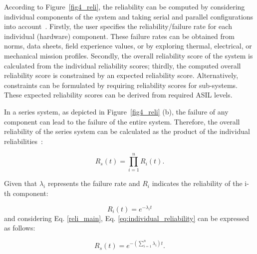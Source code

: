     
    According to Figure~\ref{fig4_reli}, the reliability can be computed by considering individual components of the system and taking serial and parallel configurations into account~\cite{Menčík16}. 
    Firstly, the user specifies the reliability/failure rate for each individual (hardware) component. These failure rates can be obtained from norms, data sheets, field experience values, or by exploring thermal, electrical, or mechanical mission profiles.
    Secondly, the overall reliability score of the system is calculated from the individual reliability scores; thirdly, the computed overall reliability score is constrained by an expected reliability score. Alternatively, constraints can be formulated by requiring reliability scores for sub-systems. These expected reliability scores can be derived from required ASIL levels.

     In a series system, as depicted in Figure~\ref{fig4_reli} (b), the failure of any component can lead to the failure of the entire system. Therefore, the overall reliability of the series system can be calculated as the product of the individual reliabilities~\cite{Menčík16}:
    
    \begin{equation}
    R_s(t) = \prod_{i=1}^n R_i(t).
    \label{reli_main}
    \end{equation}
    

    Given that $\lambda_i$ represents the failure rate and $R_i$ indicates the reliability of the i-th component:
    
    \begin{equation}
        R_i(t) = e^{-\lambda_i t}
        \label{eq:individual_reliability}
    \end{equation}
    and considering Eq. \eqref{reli_main}, Eq. \eqref{eq:individual_reliability} can be expressed as follows:
        
    \begin{equation}
            R_s(t) = e^{-(\sum_{i=1}^n \lambda_i) t}.
    \end{equation}

